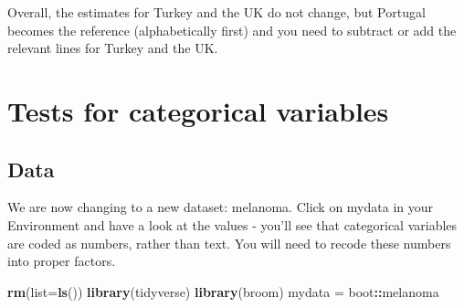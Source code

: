 \documentclass[]{book}
\makeatletter
\newenvironment{Shaded}{\begin{snugshade}}{\end{snugshade}}
\newcommand{\KeywordTok}[1]{\textcolor[rgb]{0.13,0.29,0.53}{\textbf{#1}}}
\newcommand{\DataTypeTok}[1]{\textcolor[rgb]{0.13,0.29,0.53}{#1}}
\newcommand{\DecValTok}[1]{\textcolor[rgb]{0.00,0.00,0.81}{#1}}
\newcommand{\StringTok}[1]{\textcolor[rgb]{0.31,0.60,0.02}{#1}}
\newcommand{\OperatorTok}[1]{\textcolor[rgb]{0.81,0.36,0.00}{\textbf{#1}}}
\newcommand{\NormalTok}[1]{#1}
\newenvironment{kframe}{%
\medskip{}
\setlength{\fboxsep}{.8em}
 \def\at@end@of@kframe{}%
 \ifinner\ifhmode%
  \def\at@end@of@kframe{\end{minipage}}%
  \begin{minipage}{\columnwidth}%
 \fi\fi%
 \def\FrameCommand##1{\hskip\@totalleftmargin \hskip-\fboxsep
 \colorbox{shadecolor}{##1}\hskip-\fboxsep
     \hskip-\linewidth \hskip-\@totalleftmargin \hskip\columnwidth}%
 \MakeFramed {\advance\hsize-\width
   \@totalleftmargin\z@ \linewidth\hsize
   \@setminipage}}%
 {\par\unskip\endMakeFramed%
 \at@end@of@kframe}
\renewenvironment{Shaded}{\begin{kframe}}{\end{kframe}}
\makeatother
\begin{document}
\begin{Shaded}
\end{Shaded}

Overall, the estimates for Turkey and the UK do not change, but Portugal
becomes the reference (alphabetically first) and you need to subtract or
add the relevant lines for Turkey and the UK.

\chapter{Tests for categorical
variables}\label{tests-for-categorical-variables}

\section{Data}\label{data-4}

We are now changing to a new dataset: melanoma. Click on mydata in your
Environment and have a look at the values - you'll see that categorical
variables are coded as numbers, rather than text. You will need to
recode these numbers into proper factors.

\begin{Shaded}
\begin{Highlighting}[]
\KeywordTok{rm}\NormalTok{(}\DataTypeTok{list=}\KeywordTok{ls}\NormalTok{())}
\KeywordTok{library}\NormalTok{(tidyverse)}
\KeywordTok{library}\NormalTok{(broom)}
\NormalTok{mydata =}\StringTok{ }\NormalTok{boot}\OperatorTok{::}\NormalTok{melanoma}
\end{Highlighting}
\end{Shaded}
\end{document}
